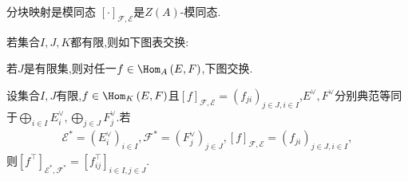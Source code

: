 \begin{proposition}{分块映射是模同态}{}
	$\left[\cdot\right]_{\mathcal{F},\mathcal{E}}$是$Z\left(A\right)$-模同态.
\end{proposition}

\begin{proposition}{}{}
	若集合$I,J,K$都有限,则如下图表交换:
	\begin{center}
	\end{center}
\end{proposition}

\begin{proposition}{}{}
	若$J$是有限集,则对任一$f\in\Hom_{A}\left(E,F\right)$,下图交换.
	\begin{center}
	\end{center}
\end{proposition}

\begin{proposition}{}{}
	设集合$I,J$有限,$f\in\Hom_{K}\left(E,F\right)$且$\left[f\right]_{\mathcal{F},\mathcal{E}}=\left(f_{ji}\right)_{j\in J,i\in I}$,$E^{\vee},F^{\vee}$分别典范等同于$\bigoplus\limits_{i\in I}E_{i}^{\vee},\bigoplus\limits_{j\in J}F_{j}^\vee$.若
	\begin{align*}
		\mathcal{E}^{\ast}=\left(E_{i}^{\vee}\right)_{i\in I},\mathcal{F}^{\ast}=\left(F_{j}^{\vee}\right)_{j\in J},\left[f\right]_{\mathcal{F},\mathcal{E}}=\left(f_{ji}\right)_{j\in J,i\in I},
	\end{align*}
	则$\left[f^{\top}\right]_{\mathcal{E^{\ast}},\mathcal{F}^{\ast}}=\left[f_{ij}^{\top}\right]_{i\in I,j\in J}$.
\end{proposition}

